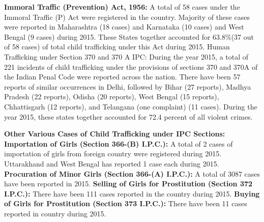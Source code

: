 \begin{multicols}{2}
\noi
\textbf{Immoral Traffic (Prevention) Act, 1956:} A total of 58 cases under the Immoral Traffic (P) Act were registered in the country. Majority of these cases were reported in Maharashtra (18 cases) and Karnataka (10 cases) and West Bengal (9 cases) during 2015. These States together accounted for 63.8\%(37 out of 58 cases) of total child trafficking under this Act during 2015. Human Trafficking under Section 370 and 370 A IPC: During the year 2015, a total of 221 incidents of child trafficking under the provisions of sections 370 and 370A of the Indian Penal Code were reported across the nation. There have been 57 reports of similar occurrences in Delhi, followed by Bihar (27 reports), Madhya Pradesh (22 reports), Odisha (20 reports), West Bengal (15 reports), Chhattisgarh (12 reports), and Telangana (one complaint) (11 cases). During the year 2015, these states together accounted for 72.4 percent of all violent crimes.

\noi
\textbf{Other Various Cases of Child Trafficking under IPC Sections: Importation of Girls (Section 366-(B) I.P.C.):} A total of 2 cases of importation of girls from foreign country were registered during 2015. Uttarakhand and West Bengal has reported 1 case each during 2015. \textbf{Procuration of Minor Girls (Section 366-(A) I.P.C.):} A total of 3087 cases have been reported in 2015. \textbf{Selling of Girls for Prostitution (Section 372 I.P.C.):} There have been 111 cases reported in the country during 2015. \textbf{Buying of Girls for Prostitution (Section 373 I.P.C.):} There have been 11 cases reported in country during 2015. 


\end{multicols}
